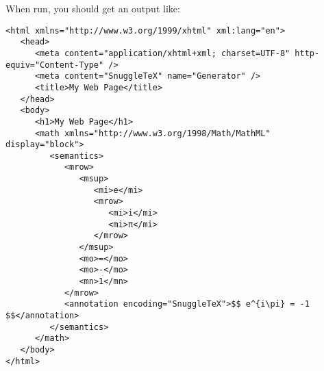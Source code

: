 When run, you should get an output like:

\begin{verbatim}
<html xmlns="http://www.w3.org/1999/xhtml" xml:lang="en">
   <head>
      <meta content="application/xhtml+xml; charset=UTF-8" http-equiv="Content-Type" />
      <meta content="SnuggleTeX" name="Generator" />
      <title>My Web Page</title>
   </head>
   <body>
      <h1>My Web Page</h1>
      <math xmlns="http://www.w3.org/1998/Math/MathML" display="block">
         <semantics>
            <mrow>
               <msup>
                  <mi>e</mi>
                  <mrow>
                     <mi>i</mi>
                     <mi>π</mi>
                  </mrow>
               </msup>
               <mo>=</mo>
               <mo>-</mo>
               <mn>1</mn>
            </mrow>
            <annotation encoding="SnuggleTeX">$$ e^{i\pi} = -1 $$</annotation>
         </semantics>
      </math>
   </body>
</html>
\end{verbatim}
